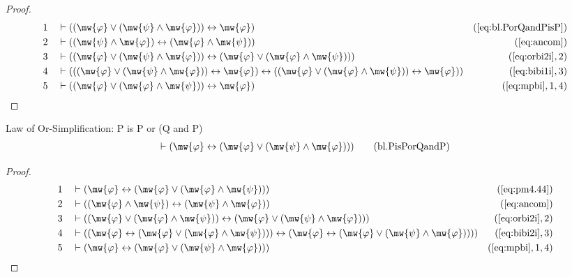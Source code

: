 \begin{proof}
\begin{align}
  1 &&  & \vdash ( ( \mw{\varphi} \vee ( \mw{\psi} \wedge \mw{\varphi} ) ) \leftrightarrow \mw{\varphi} )&(\mbox{\ref{eq:bl.PorQandPisP}})\notag
  \\ 2 &&  & \vdash ( ( \mw{\psi} \wedge \mw{\varphi} ) \leftrightarrow ( \mw{\varphi} \wedge \mw{\psi} ) )&(\mbox{\ref{eq:ancom}})\notag
  \\ 3 &&  & \vdash ( ( \mw{\varphi} \vee ( \mw{\psi} \wedge \mw{\varphi} ) ) \leftrightarrow ( \mw{\varphi} \vee ( \mw{\varphi} \wedge \mw{\psi} ) ) )&(\mbox{\ref{eq:orbi2i}},2)\notag
  \\ 4 &&  & \vdash ( ( ( \mw{\varphi} \vee ( \mw{\psi} \wedge \mw{\varphi} ) ) \leftrightarrow \mw{\varphi} ) \leftrightarrow ( ( \mw{\varphi} \vee ( \mw{\varphi} \wedge \mw{\psi} ) ) \leftrightarrow \mw{\varphi} ) )&(\mbox{\ref{eq:bibi1i}},3)\notag
  \\ 5 &&  & \vdash ( ( \mw{\varphi} \vee ( \mw{\varphi} \wedge \mw{\psi} ) ) \leftrightarrow \mw{\varphi} )&(\mbox{\ref{eq:mpbi}},1,4)\notag
\end{align}
\end{proof}

\begin{lemma} Law of Or-Simplification: P is P or
(Q and P)
\begin{align}
\vdash ( \mw{\varphi} \leftrightarrow ( \mw{\varphi} \vee ( \mw{\psi} \wedge
    \mw{\varphi} ) ) )\label{eq:bl.PisPorQandP}\tag{bl.PisPorQandP}
\end{align}
\end{lemma}

\begin{proof}
\begin{align}
  1 &&  & \vdash ( \mw{\varphi} \leftrightarrow ( \mw{\varphi} \vee ( \mw{\varphi} \wedge \mw{\psi} ) ) )&(\mbox{\ref{eq:pm4.44}})\notag
  \\ 2 &&  & \vdash ( ( \mw{\varphi} \wedge \mw{\psi} ) \leftrightarrow ( \mw{\psi} \wedge \mw{\varphi} ) )&(\mbox{\ref{eq:ancom}})\notag
  \\ 3 &&  & \vdash ( ( \mw{\varphi} \vee ( \mw{\varphi} \wedge \mw{\psi} ) ) \leftrightarrow ( \mw{\varphi} \vee ( \mw{\psi} \wedge \mw{\varphi} ) ) )&(\mbox{\ref{eq:orbi2i}},2)\notag
  \\ 4 &&  & \vdash ( ( \mw{\varphi} \leftrightarrow ( \mw{\varphi} \vee ( \mw{\varphi} \wedge \mw{\psi} ) ) ) \leftrightarrow ( \mw{\varphi} \leftrightarrow ( \mw{\varphi} \vee ( \mw{\psi} \wedge \mw{\varphi} ) ) ) )&(\mbox{\ref{eq:bibi2i}},3)\notag
  \\ 5 &&  & \vdash ( \mw{\varphi} \leftrightarrow ( \mw{\varphi} \vee ( \mw{\psi} \wedge \mw{\varphi} ) ) )&(\mbox{\ref{eq:mpbi}},1,4)\notag
\end{align}
\end{proof}

